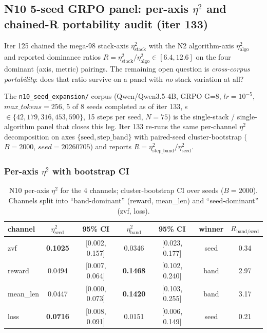 \subsection{N10 5-seed GRPO panel: per-axis \texorpdfstring{$\eta^2$}{eta\textasciicircum 2} and chained-R portability audit (iter 133)}
\label{sec:p5-iter133-n10-eta2}

Iter 125 chained the mega-98 stack-axis $\eta^2_{\mathrm{stack}}$ with the
N2 algorithm-axis $\eta^2_{\mathrm{algo}}$ and reported dominance ratios
$R = \eta^2_{\mathrm{stack}} / \eta^2_{\mathrm{algo}} \in [6.4, 12.6]$ on
the four dominant (axis, metric) pairings. The remaining open question is
\emph{cross-corpus portability}: does that ratio survive on a panel with
\emph{no} stack variation at all?

The \texttt{n10\_seed\_expansion/} corpus (Qwen/Qwen3.5-4B, GRPO G=8,
$lr=10^{-5}$, $max\_tokens=256$, 5 of 8 seeds completed as of iter 133,
s$\in\{42,179,316,453,590\}$, 15 steps per seed, $N=75$) is the
single-stack / single-algorithm panel that closes this leg. Iter 133
re-runs the same per-channel $\eta^2$ decomposition on axes
$\{\mathrm{seed}, \mathrm{step\_band}\}$ with paired-seed cluster-bootstrap
($B=2000$, $seed=20260705$) and reports $R = \eta^2_{\mathrm{step\_band}} / \eta^2_{\mathrm{seed}}$.

\subsubsection{Per-axis \texorpdfstring{$\eta^2$}{eta\textasciicircum 2} with bootstrap CI}
\label{sec:p5-iter133-per-axis}
\begin{table}[t]
\centering
\small
\begin{tabular}{lcccccc}
\toprule
channel & $\eta^2_{\mathrm{seed}}$ & 95\% CI & $\eta^2_{\mathrm{band}}$ & 95\% CI & winner & $R_{\mathrm{band/seed}}$\\
\midrule
zvf       & \textbf{0.1025} & [0.002, 0.157] & 0.0346 & [0.023, 0.177] & seed & 0.34\\
reward    & 0.0494 & [0.007, 0.064] & \textbf{0.1468} & [0.102, 0.240] & band & 2.97\\
mean\_len & 0.0447 & [0.000, 0.073] & \textbf{0.1420} & [0.103, 0.255] & band & 3.17\\
loss      & \textbf{0.0716} & [0.008, 0.091] & 0.0151 & [0.006, 0.149] & seed & 0.21\\
\bottomrule
\end{tabular}
\caption{N10 per-axis $\eta^2$ for the 4 channels; cluster-bootstrap CI over
seeds ($B=2000$).  Channels split into ``band-dominant'' (reward, mean\_len)
and ``seed-dominant'' (zvf, loss).}
\label{tab:p5-iter133-eta2}
\end{table}

